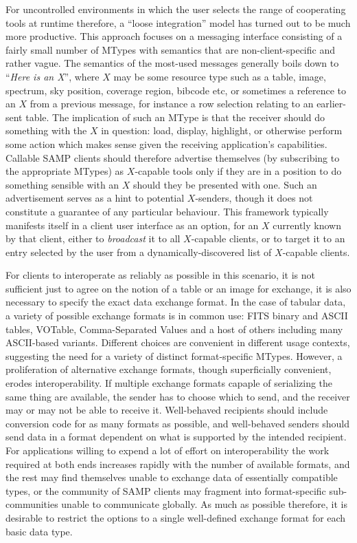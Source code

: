 \documentclass[5p]{elsarticle}
\begin{document}
For uncontrolled environments in which the user selects
the range of cooperating tools at runtime therefore,
a ``loose integration'' model has turned out to be much more productive.
This approach focuses on a messaging interface
consisting of a fairly small number of MTypes with
semantics that are non-client-specific and rather vague.
The semantics of the most-used messages generally boils down to
``{\em Here is an X}'', where $X$ may be some resource type such as a
table, image, spectrum,
sky position, coverage region, bibcode etc,
or sometimes a reference to an $X$ from a previous message,
for instance a row selection relating to an earlier-sent table.
The implication of such an MType is that the receiver should do
something with the $X$ in question: load, display, highlight,
or otherwise perform some action which makes sense given the
receiving application's capabilities.
Callable SAMP clients should therefore advertise themselves
(by subscribing to the appropriate MTypes) as $X$-capable
tools only if they are in a position to do something sensible
with an $X$ should they be presented with one.
Such an advertisement serves as a hint to potential $X$-senders,
though it does not constitute a guarantee of any particular behaviour.
This framework typically manifests itself in a client user interface
as an option, for an $X$ currently known by that client,
either to {\em broadcast\/} it to all $X$-capable clients,
or to target it to an entry selected by the user
from a dynamically-discovered list of $X$-capable clients.

For clients to interoperate as reliably as possible in this scenario,
it is not sufficient just to agree on the notion of a table or an image
for exchange, it is also necessary to specify the exact data exchange
format.
In the case of tabular data, a variety of possible exchange formats
is in common use: FITS binary and ASCII tables, VOTable,
Comma-Separated Values and a host of others including 
many ASCII-based variants.  Different choices are convenient in
different usage contexts, suggesting the need for a variety of
distinct format-specific MTypes.
However, a proliferation of alternative exchange formats,
though superficially convenient, erodes interoperability.
If multiple exchange formats capaple of serializing the same thing
are available,
the sender has to choose which to send, and the receiver may or
may not be able to receive it.
Well-behaved recipients should include conversion code for as many
formats as possible, and well-behaved senders should send data
in a format dependent on what is supported by the intended recipient.
For applications willing to expend a lot of effort on interoperability 
the work required at both ends increases rapidly with the number of
available formats, and the rest may find themselves unable to
exchange data of essentially compatible types,
or the community of SAMP clients may fragment into format-specific
sub-communities unable to communicate globally.
As much as possible therefore, it is desirable to restrict the options
to a single well-defined exchange format for each basic data type.
\end{document}
